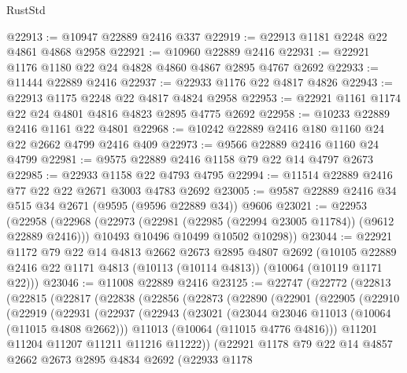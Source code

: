 \begin{lexlean}{RustStd}
\begin{coremodule}
@22913 := @10947 @22889 @2416 @337
@22919 := @22913 @1181 @2248 @22 @4861 @4868 @2958
@22921 := @10960 @22889 @2416
@22931 := @22921 @1176 @1180 @22 @24 @4828 @4860 @4867 @2895 @4767 @2692
@22933 := @11444 @22889 @2416
@22937 := @22933 @1176 @22 @4817 @4826
@22943 := @22913 @1175 @2248 @22 @4817 @4824 @2958
@22953 := @22921 @1161 @1174 @22 @24 @4801 @4816 @4823 @2895 @4775 @2692
@22958 := @10233 @22889 @2416 @1161 @22 @4801
@22968 := @10242 @22889 @2416 @180 @1160 @24 @22 @2662 @4799 @2416 @409
@22973 := @9566 @22889 @2416 @1160 @24 @4799
@22981 := @9575 @22889 @2416 @1158 @79 @22 @14 @4797 @2673
@22985 := @22933 @1158 @22 @4793 @4795
@22994 := @11514 @22889 @2416 @77 @22 @22 @2671 @3003 @4783 @2692
@23005 := @9587 @22889 @2416 @34 @515 @34 @2671 (@9595 (@9596 @22889 @34)) @9606
@23021 := @22953
    (@22958
      (@22968
        (@22973 (@22981 (@22985 (@22994 @23005 @11784)) (@9612 @22889 @2416)))
        @10493
        @10496
        @10499
        @10502
        @10298))
@23044 := @22921
    @1172
    @79
    @22
    @14
    @4813
    @2662
    @2673
    @2895
    @4807
    @2692
    (@10105 @22889 @2416 @22 @1171 @4813 (@10113 (@10114 @4813)) (@10064 (@10119 @1171 @22)))
@23046 := @11008 @22889 @2416
@23125 := @22747
    (@22772
      (@22813
        (@22815
          (@22817
            (@22838
              (@22856
                (@22873
                  (@22890
                    (@22901
                      (@22905
                        (@22910
                          (@22919
                            (@22931
                              (@22937
                                (@22943
                                  (@23021
                                    (@23044 @23046 @11013 (@10064 (@11015 @4808 @2662)))
                                    @11013
                                    (@10064 (@11015 @4776 @4816)))
                                  @11201
                                  @11204
                                  @11207
                                  @11211
                                  @11216
                                  @11222))
                              (@22921
                                @1178
                                @79
                                @22
                                @14
                                @4857
                                @2662
                                @2673
                                @2895
                                @4834
                                @2692
                                (@22933
                                  @1178

\end{coremodule}
\end{lexlean}
